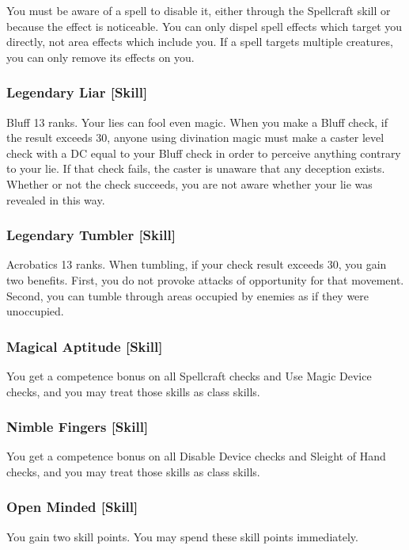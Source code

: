 You must be aware of a spell to disable it, either through the Spellcraft skill or because the effect is noticeable. You can only dispel spell effects which target you directly, not area effects which include you. If a spell targets multiple creatures, you can only remove its effects on you.

\subsubsection{Legendary Liar [Skill]}
\featpre Bluff 13 ranks.
\featben Your lies can fool even magic. When you make a Bluff check, if the result exceeds 30, anyone using divination magic must make a caster level check with a DC equal to your Bluff check in order to perceive anything contrary to your lie. If that check fails, the caster is unaware that any deception exists. Whether or not the check succeeds, you are not aware whether your lie was revealed in this way.

\subsubsection{Legendary Tumbler [Skill]}
\featpre Acrobatics 13 ranks.
\featben When tumbling, if your check result exceeds 30, you gain two benefits. First, you do not provoke attacks of opportunity for that movement. Second, you can tumble through areas occupied by enemies as if they were unoccupied.

\subsubsection{Magical Aptitude [Skill]}
 You get a  competence bonus on all Spellcraft checks and Use Magic Device checks, and you may treat those skills as class skills.

\subsubsection{Nimble Fingers [Skill]}
 You get a  competence bonus on all Disable Device checks and Sleight of Hand checks, and you may treat those skills as class skills.

\subsubsection{Open Minded [Skill]}
 You gain two skill points. You may spend these skill points immediately.

